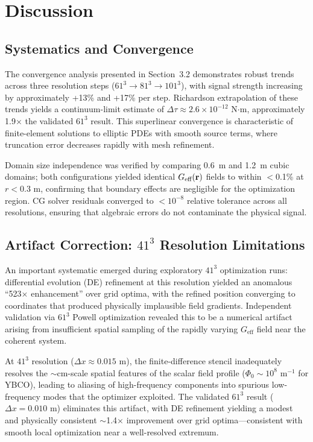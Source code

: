 \documentclass[10pt,twocolumn]{article}
\begin{document}
\section{Discussion}

\subsection{Systematics and Convergence}

The convergence analysis presented in Section~3.2 demonstrates robust trends across three resolution steps ($61^3 \rightarrow 81^3 \rightarrow 101^3$), with signal strength increasing by approximately +13\% and +17\% per step. Richardson extrapolation of these trends yields a continuum-limit estimate of $\Delta\tau \approx 2.6 \times 10^{-12}$ N$\cdot$m, approximately 1.9$\times$ the validated $61^3$ result. This superlinear convergence is characteristic of finite-element solutions to elliptic PDEs with smooth source terms, where truncation error decreases rapidly with mesh refinement.

Domain size independence was verified by comparing 0.6~m and 1.2~m cubic domains; both configurations yielded identical $G_{\text{eff}}({\bf r})$ fields to within $<$0.1\% at $r < 0.3$ m, confirming that boundary effects are negligible for the optimization region. CG solver residuals converged to $< 10^{-8}$ relative tolerance across all resolutions, ensuring that algebraic errors do not contaminate the physical signal.

\subsection{Artifact Correction: $41^3$ Resolution Limitations}

An important systematic emerged during exploratory $41^3$ optimization runs: differential evolution (DE) refinement at this resolution yielded an anomalous ``523$\times$ enhancement'' over grid optima, with the refined position converging to coordinates that produced physically implausible field gradients. Independent validation via $61^3$ Powell optimization revealed this to be a numerical artifact arising from insufficient spatial sampling of the rapidly varying $G_{\text{eff}}$ field near the coherent system.

At $41^3$ resolution ($\Delta x \approx 0.015$ m), the finite-difference stencil inadequately resolves the $\sim$cm-scale spatial features of the scalar field profile ($\Phi_0 \sim 10^8$ m$^{-1}$ for YBCO), leading to aliasing of high-frequency components into spurious low-frequency modes that the optimizer exploited. The validated $61^3$ result ($\Delta x = 0.010$ m) eliminates this artifact, with DE refinement yielding a modest and physically consistent $\sim$1.4$\times$ improvement over grid optima---consistent with smooth local optimization near a well-resolved extremum.
\end{document}
